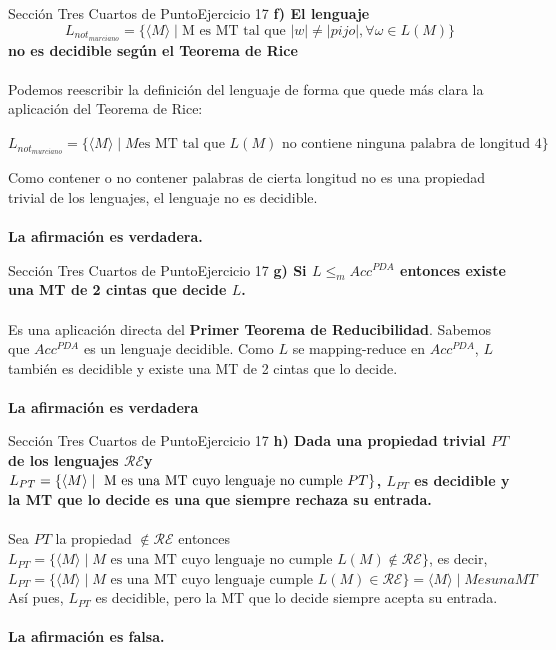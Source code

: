 \documentclass[10pt, envcountsect, presentation, aspectratio=169]{beamer}
\newcommand{\lr}{\ensuremath{\mathcal {RE}}}
\begin{document}

\begin{frame}{Sección Tres Cuartos de Punto}{Ejercicio 17}
    \textbf{f) El lenguaje $$L_{not_{murciano}}=\{\langle M \rangle \mid \mbox{M es MT  tal que } |w|\neq |pijo|,  \forall \omega \in L(M) \}$$  no es decidible según el Teorema de Rice}\\~\\
    
    Podemos reescribir la definición del lenguaje de forma que quede más clara la aplicación del Teorema de Rice:
    \begin{center}
        $L_{not_{murciano}}=\{\langle M \rangle \mid M \text{es MT tal que } L(M) \text{ no contiene ninguna palabra de longitud 4}\}$
    \end{center}
    Como contener o no contener palabras de cierta longitud no es una propiedad trivial de los lenguajes, el lenguaje no es decidible.\\~\\

    \textbf{La afirmación es verdadera.}
\end{frame}


\begin{frame}{Sección Tres Cuartos de Punto}{Ejercicio 17}
    \textbf{g) Si $L\le_m  Acc^{PDA}$ entonces existe una MT de 2 cintas que decide $L$. }\\~\\
    Es una aplicación directa del \textbf{Primer Teorema de Reducibilidad}. Sabemos que $Acc^{PDA}$ es un lenguaje decidible.
    Como $L$ se mapping-reduce en $Acc^{PDA}$, $L$ también es decidible y existe una MT de 2 cintas que lo decide.\\~\\

    \textbf{La afirmación es verdadera}
\end{frame}


\begin{frame}{Sección Tres Cuartos de Punto}{Ejercicio 17}
    \textbf{h) Dada  una propiedad trivial $PT$ de los lenguajes \lr \space y $L_{PT}=\{\langle M \rangle \mid \hbox{ M es una MT cuyo lenguaje no cumple } PT\}$, $L_{PT}$ es decidible y la MT que lo decide es una que siempre rechaza su entrada.}\\~\\
   
    Sea $PT$ la propiedad $ \notin \mathcal{RE}$ entonces $L_{PT} = \{\langle M \rangle \mid M \text{ es una MT cuyo lenguaje no cumple } L(M) \notin \mathcal{RE}\}$, es decir, $L_{PT} = \{\langle M \rangle \mid M \text{ es una MT cuyo lenguaje cumple } L(M) \in \mathcal{RE}\} = {\langle M \rangle \mid M es una MT}$
    Así pues, $L_{PT}$ es decidible, pero la MT que lo decide siempre acepta su entrada.\\~\\

    \textbf{La afirmación es falsa.}
\end{frame}
\end{document}
